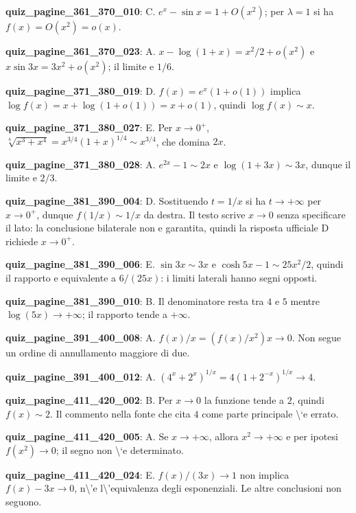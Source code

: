 \documentclass[11pt,a4paper]{article}
\newcounter{quiz}
\begin{document}
\noindent\textbf{quiz\_pagine\_361\_370\_010}: C. $e^x-\sin x=1+O(x^2)$; per $\lambda=1$ si ha $f(x)=O(x^2)=o(x)$.\par\medskip
\noindent\textbf{quiz\_pagine\_361\_370\_023}: A. $x-\log(1+x)=x^2/2+o(x^2)$ e $x\sin3x=3x^2+o(x^2)$; il limite e $1/6$.\par\medskip
\noindent\textbf{quiz\_pagine\_371\_380\_019}: D. $f(x)=e^x(1+o(1))$ implica $\log f(x)=x+\log(1+o(1))=x+o(1)$, quindi $\log f(x)\sim x$.\par\medskip
\noindent\textbf{quiz\_pagine\_371\_380\_027}: E. Per $x\to0^+$, $\sqrt[4]{x^3+x^4}=x^{3/4}(1+x)^{1/4}\sim x^{3/4}$, che domina $2x$.\par\medskip
\noindent\textbf{quiz\_pagine\_371\_380\_028}: A. $e^{2x}-1\sim2x$ e $\log(1+3x)\sim3x$, dunque il limite e $2/3$.\par\medskip
\noindent\textbf{quiz\_pagine\_381\_390\_004}: D. Sostituendo $t=1/x$ si ha $t\to+\infty$ per $x\to0^+$, dunque $f(1/x)\sim1/x$ da destra. Il testo scrive $x\to0$ senza specificare il lato: la conclusione bilaterale non e garantita, quindi la risposta ufficiale D richiede $x\to0^+$.\par\medskip
\noindent\textbf{quiz\_pagine\_381\_390\_006}: E. $\sin3x\sim3x$ e $\cosh5x-1\sim25x^2/2$, quindi il rapporto e equivalente a $6/(25x)$: i limiti laterali hanno segni opposti.\par\medskip
\noindent\textbf{quiz\_pagine\_381\_390\_010}: B. Il denominatore resta tra $4$ e $5$ mentre $\log(5x)\to+\infty$; il rapporto tende a $+\infty$.\par\medskip
\noindent\textbf{quiz\_pagine\_391\_400\_008}: A. $f(x)/x=(f(x)/x^2)x\to0$. Non segue un ordine di annullamento maggiore di due.\par\medskip
\noindent\textbf{quiz\_pagine\_391\_400\_012}: A. $(4^x+2^x)^{1/x}=4(1+2^{-x})^{1/x}\to4$.\par\medskip
\noindent\textbf{quiz\_pagine\_411\_420\_002}: B. Per $x\to0$ la funzione tende a $2$, quindi $f(x)\sim2$. Il commento nella fonte che cita $4$ come parte principale \textbackslash{}`e errato.\par\medskip
\noindent\textbf{quiz\_pagine\_411\_420\_005}: A. Se $x\to+\infty$, allora $x^2\to+\infty$ e per ipotesi $f(x^2)\to0$; il segno non \textbackslash{}`e determinato.\par\medskip
\noindent\textbf{quiz\_pagine\_411\_420\_024}: E. $f(x)/(3x)\to1$ non implica $f(x)-3x\to0$, n\textbackslash{}'e l\textbackslash{}'equivalenza degli esponenziali. Le altre conclusioni non seguono.\par\medskip
\end{document}
